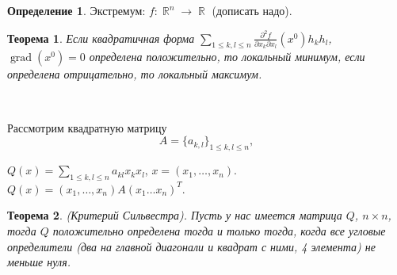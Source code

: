 \documentclass[a4paper,100pt]{article}
\theoremstyle{indented}
\newtheorem{theorem}{Теорема}
\theoremstyle{definition}
\newtheorem{defn}{Определение}
\theoremstyle{remark}
\DeclareMathOperator{\RR}{\mathbb{R}}
\DeclareMathOperator{\grad}{grad}
\begin{document}
\begin{defn}
    Экстремум: $f:\RR^n\rightarrow \RR$ (дописать надо).
\end{defn}

\begin{theorem}
    Если квадратичная форма $\sum_{1\leq k, l\leq n}\frac{\partial^2 f}{\partial x_k \partial x_l}(x^0)h_kh_l$, $\grad (x^0)=0$ определена положительно, то локальный минимум, если определена отрицательно, то локальный максимум.
\end{theorem}\

Рассмотрим квадратную матрицу 
\[
    A = \{a_{k, l}\}_{1\leq k, l \leq n},
\]    
    
$Q(x)=\sum_{1\leq k, l \leq n}a_{k l}x_k x_l$,  $x=(x_1, \ldots, x_n)$. $Q(x)=(x_1, \ldots, x_n)A(x_1\ldots x_n)^T$.\\

\begin{theorem}
    (Критерий Сильвестра). Пусть у нас имеется матрица $Q$, $n\times n$, тогда $Q$ положительно определена тогда и только тогда, когда все угловые определители (два на главной диагонали и квадрат с ними, 4 элемента) не меньше нуля.
\end{theorem}
\end{document}

